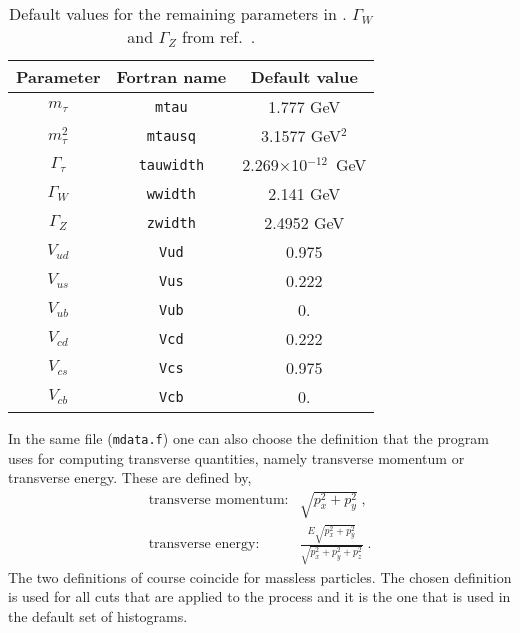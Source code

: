 \documentclass[12pt]{article}
\begin{document}
\begin{table}
\begin{center}
\begin{tabular}{|c|c|c|} \hline
Parameter & Fortran name & Default value \\ 
\hline
$m_\tau$         & {\tt mtau}      & 1.777 GeV            \\
$m^2_\tau$& {\tt mtausq}  & 3.1577 GeV$^2$     \\
$\Gamma_\tau$    & {\tt tauwidth}& 2.269$\times$10$^{-12}$~GeV \\
$\Gamma_W$       & {\tt wwidth}  & 2.141 GeV               \\
$\Gamma_Z$       & {\tt zwidth}  & 2.4952 GeV               \\
$V_{ud}$         & {\tt Vud}     & 0.975                  \\
$V_{us}$         & {\tt Vus}     & 0.222             \\
$V_{ub}$         & {\tt Vub}     & 0.                     \\
$V_{cd}$         & {\tt Vcd}     & 0.222             \\
$V_{cs}$         & {\tt Vcs}     & 0.975                  \\
$V_{cb}$         & {\tt Vcb}     & 0.                     \\
\hline
\end{tabular}
\caption{Default values for the remaining parameters in \MCFM.
$\Gamma_W$ and $\Gamma_Z$ from ref.~\cite{Amsler:2008zzb}.}
\label{default} 
\end{center}
\end{table}

In the same file ({\tt mdata.f}) one can also choose the definition
that the program uses for computing transverse quantities, namely
transverse momentum or transverse energy. These are defined by,
\begin{eqnarray}
\mbox{transverse momentum:} & \sqrt{p_x^2+p_y^2} \; ,\nonumber \\
\mbox{transverse energy:}   &
 \frac{E \sqrt{p_x^2+p_y^2}}{\sqrt{p_x^2+p_y^2+p_z^2}} \; .
\end{eqnarray}
The two definitions of course coincide for massless particles.
The chosen definition is used for all cuts that are applied to the
process and it is the one that is used in the default set of histograms.
\end{document}
